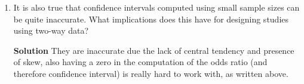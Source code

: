 \begin{enumerate}
\begin{enumerate}
        \item It is also true that confidence intervals computed using small sample sizes can be quite inaccurate. What implications does this have for designing studies using two-way data?
        \begin{framed}{\textbf{Solution}}
        They are inaccurate due the lack of central tendency and presence of skew, also having a zero in the computation of the odds ratio (and therefore confidence interval) is really hard to work with, as written above. 
        \end{framed}
    \end{enumerate}
\end{enumerate}
